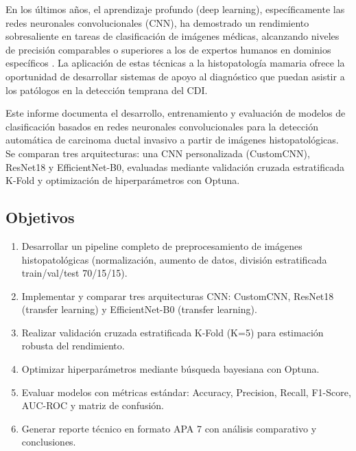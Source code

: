 \documentclass[12pt,a4paper]{article}
\begin{document}
En los últimos años, el aprendizaje profundo (deep learning), específicamente las redes neuronales convolucionales 
(CNN), ha demostrado un rendimiento sobresaliente en tareas de clasificación de imágenes médicas, 
alcanzando niveles de precisión comparables o superiores a los de expertos humanos en dominios específicos 
\cite{esteva2017dermatologist, liu2019artificial}. La aplicación de estas técnicas a la histopatología 
mamaria ofrece la oportunidad de desarrollar sistemas de apoyo al diagnóstico que puedan asistir a los 
patólogos en la detección temprana del CDI.

Este informe documenta el desarrollo, entrenamiento y evaluación de modelos de clasificación basados en 
redes neuronales convolucionales para la detección automática de carcinoma ductal invasivo a partir de 
imágenes histopatológicas. Se comparan tres arquitecturas: una CNN personalizada (CustomCNN), ResNet18 
y EfficientNet-B0, evaluadas mediante validación cruzada estratificada K-Fold y optimización de 
hiperparámetros con Optuna.

\subsection{Objetivos}

\begin{enumerate}
    \item Desarrollar un pipeline completo de preprocesamiento de imágenes histopatológicas 
          (normalización, aumento de datos, división estratificada train/val/test 70/15/15).
    \item Implementar y comparar tres arquitecturas CNN: CustomCNN, ResNet18 
          (transfer learning) y EfficientNet-B0 (transfer learning).
    \item Realizar validación cruzada estratificada K-Fold (K=5) para estimación robusta del rendimiento.
    \item Optimizar hiperparámetros mediante búsqueda bayesiana con Optuna.
    \item Evaluar modelos con métricas estándar: Accuracy, Precision, Recall, F1-Score, AUC-ROC y matriz de confusión.
    \item Generar reporte técnico en formato APA 7 con análisis comparativo y conclusiones.
\end{enumerate}
\end{document}
